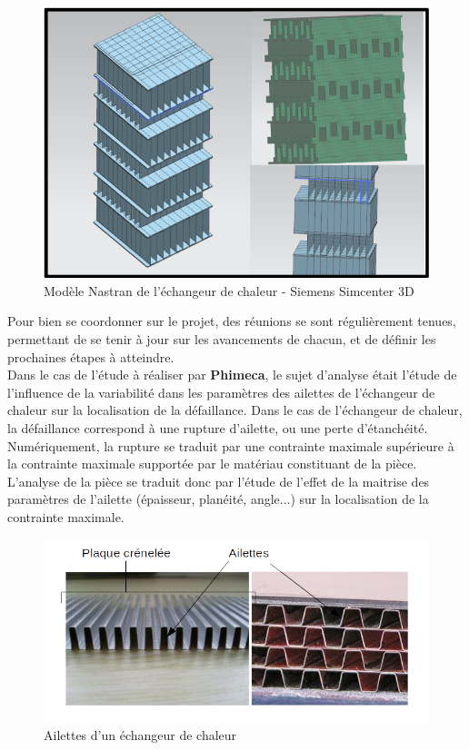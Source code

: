 \documentclass[a4paper,10pt]{article}
\begin{document}
\begin{figure}[H]
   \centering   
   \includegraphics[scale=0.3]{exchangerModel.png}
      \caption{Modèle Nastran de l’échangeur de chaleur - Siemens Simcenter 3D}
         \label{exchangerModel}
\end{figure}

Pour bien se coordonner sur le projet, des réunions se sont régulièrement tenues, permettant de se tenir à jour sur les avancements de chacun, et de définir les prochaines étapes à atteindre. \\ 

Dans le cas de l'étude à réaliser par \textbf{Phimeca}, le sujet d'analyse était l'étude de l'influence de la variabilité dans les paramètres des ailettes de l'échangeur de chaleur sur la localisation de la défaillance. Dans le cas de l'échangeur de chaleur, la défaillance correspond à une rupture d’ailette, ou une perte d’étanchéité. \\

Numériquement, la rupture se traduit par une contrainte maximale supérieure à la contrainte maximale supportée par le matériau constituant de la pièce. L'analyse de la pièce se traduit donc par l'étude de l'effet de la maitrise des paramètres de l'ailette (épaisseur, planéité, angle...) sur la localisation de la contrainte maximale. 

\begin{figure}[H]
   \centering   
   \includegraphics[scale=0.45]{SchemaAilettes.png}
      \caption{Ailettes d'un échangeur de chaleur}
         \label{SchemaAilettes}
\end{figure}
\end{document}
